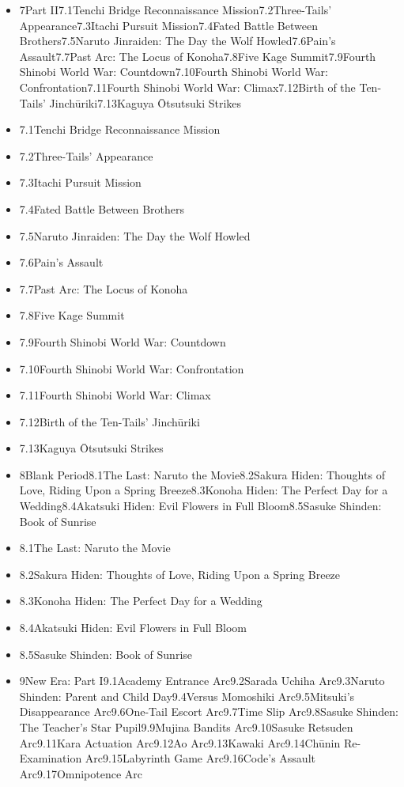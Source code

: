\documentclass[a4paper,12pt]{article}
\begin{document}
\begin{itemize}
\item 7Part II7.1Tenchi Bridge Reconnaissance Mission7.2Three-Tails' Appearance7.3Itachi Pursuit Mission7.4Fated Battle Between Brothers7.5Naruto Jinraiden: The Day the Wolf Howled7.6Pain's Assault7.7Past Arc: The Locus of Konoha7.8Five Kage Summit7.9Fourth Shinobi World War: Countdown7.10Fourth Shinobi World War: Confrontation7.11Fourth Shinobi World War: Climax7.12Birth of the Ten-Tails' Jinchūriki7.13Kaguya Ōtsutsuki Strikes
\item 7.1Tenchi Bridge Reconnaissance Mission
\item 7.2Three-Tails' Appearance
\item 7.3Itachi Pursuit Mission
\item 7.4Fated Battle Between Brothers
\item 7.5Naruto Jinraiden: The Day the Wolf Howled
\item 7.6Pain's Assault
\item 7.7Past Arc: The Locus of Konoha
\item 7.8Five Kage Summit
\item 7.9Fourth Shinobi World War: Countdown
\item 7.10Fourth Shinobi World War: Confrontation
\item 7.11Fourth Shinobi World War: Climax
\item 7.12Birth of the Ten-Tails' Jinchūriki
\item 7.13Kaguya Ōtsutsuki Strikes
\item 8Blank Period8.1The Last: Naruto the Movie8.2Sakura Hiden: Thoughts of Love, Riding Upon a Spring Breeze8.3Konoha Hiden: The Perfect Day for a Wedding8.4Akatsuki Hiden: Evil Flowers in Full Bloom8.5Sasuke Shinden: Book of Sunrise
\item 8.1The Last: Naruto the Movie
\item 8.2Sakura Hiden: Thoughts of Love, Riding Upon a Spring Breeze
\item 8.3Konoha Hiden: The Perfect Day for a Wedding
\item 8.4Akatsuki Hiden: Evil Flowers in Full Bloom
\item 8.5Sasuke Shinden: Book of Sunrise
\item 9New Era: Part I9.1Academy Entrance Arc9.2Sarada Uchiha Arc9.3Naruto Shinden: Parent and Child Day9.4Versus Momoshiki Arc9.5Mitsuki's Disappearance Arc9.6One-Tail Escort Arc9.7Time Slip Arc9.8Sasuke Shinden: The Teacher's Star Pupil9.9Mujina Bandits Arc9.10Sasuke Retsuden Arc9.11Kara Actuation Arc9.12Ao Arc9.13Kawaki Arc9.14Chūnin Re-Examination Arc9.15Labyrinth Game Arc9.16Code's Assault Arc9.17Omnipotence Arc

\end{itemize}
\end{document}
